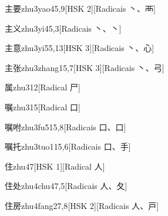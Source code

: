 \begin{entry}{主要}{zhu3yao4}{5,9}[HSK 2][Radicais ⼂、⾑]
\end{entry}

\begin{entry}{主义}{zhu3yi4}{5,3}[Radicais ⼂、⼂]
\end{entry}

\begin{entry}{主意}{zhu3yi5}{5,13}[HSK 3][Radicais ⼂、⼼]
\end{entry}

\begin{entry}{主张}{zhu3zhang1}{5,7}[HSK 3][Radicais ⼂、⼸]
\end{entry}

\begin{entry}{属}{zhu3}{12}[Radical ⼫]
\end{entry}

\begin{entry}{嘱}{zhu3}{15}[Radical ⼝]
\end{entry}

\begin{entry}{嘱咐}{zhu3fu5}{15,8}[Radicais ⼝、⼝]
\end{entry}

\begin{entry}{嘱托}{zhu3tuo1}{15,6}[Radicais ⼝、⼿]
\end{entry}

\begin{entry}{住}{zhu4}{7}[HSK 1][Radical ⼈]
\end{entry}

\begin{entry}{住处}{zhu4chu4}{7,5}[Radicais ⼈、⼡]
\end{entry}

\begin{entry}{住房}{zhu4fang2}{7,8}[HSK 2][Radicais ⼈、⼾]
\end{entry}

